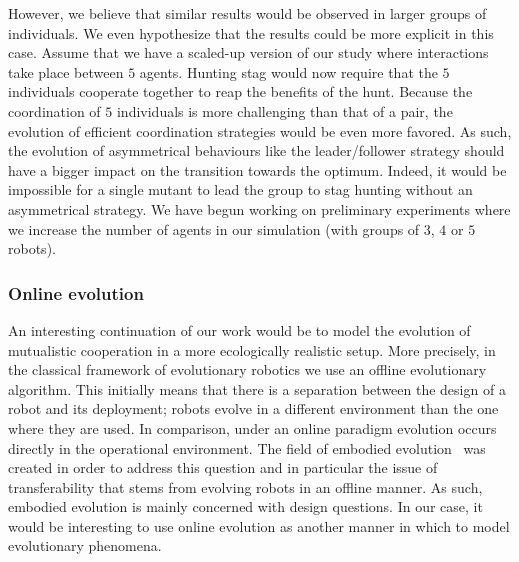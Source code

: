 			However, we believe that similar results would be observed in larger groups of individuals. We even hypothesize that the results could be more explicit in this case. Assume that we have a scaled-up version of our study where interactions take place between $5$ agents. Hunting stag would now require that the $5$ individuals cooperate together to reap the benefits of the hunt. Because the coordination of $5$ individuals is more challenging than that of a pair, the evolution of efficient coordination strategies would be even more favored. As such, the evolution of asymmetrical behaviours like the leader/follower strategy should have a bigger impact on the transition towards the optimum. Indeed, it would be impossible for a single mutant to lead the group to stag hunting without an asymmetrical strategy. We have begun working on preliminary experiments where we increase the number of agents in our simulation (with groups of $3$, $4$ or $5$ robots). 



		\subsubsection{Online evolution}

			An interesting continuation of our work would be to model the evolution of mutualistic cooperation in a more ecologically realistic setup. More precisely, in the classical framework of evolutionary robotics we use an offline evolutionary algorithm. This initially means that there is a separation between the design of a robot and its deployment; robots evolve in a different environment than the one where they are used. In comparison, under an online paradigm evolution occurs directly in the operational environment. The field of embodied evolution~\parencite{Watson2002} was created in order to address this question and in particular the issue of transferability that stems from evolving robots in an offline manner. As such, embodied evolution is mainly concerned with design questions. In our case, it would be interesting to use online evolution as another manner in which to model evolutionary phenomena. 

